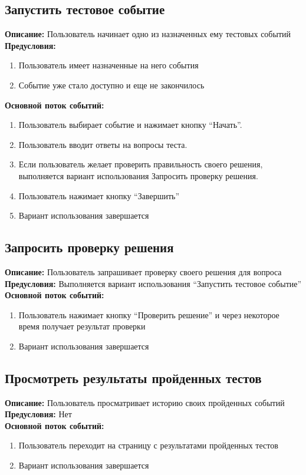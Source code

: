 \documentclass{article}
\begin{document}
    \subsection{Запустить тестовое событие}
    \textbf{Описание:} Пользователь начинает одно из назначенных ему тестовых
    событий\\
    \textbf{Предусловия:} 
    \begin{enumerate}
        \item Пользователь имеет назначенные на него события
        \item Событие уже стало доступно и еще не закончилось
    \end{enumerate}
    \textbf{Основной поток событий:}
    \begin{enumerate}
        \item Пользователь выбирает событие и нажимает кнопку “Начать”.
        \item Пользователь вводит ответы на вопросы теста.
        \item Если пользователь желает проверить правильность своего решения, выполняется вариант использования Запросить проверку решения.
        \item Пользователь нажимает кнопку “Завершить”
        \item Вариант использования завершается    
    \end{enumerate}

    \subsection{Запросить проверку решения}
    \textbf{Описание:} Пользователь запрашивает проверку своего решения для вопроса\\
    \textbf{Предусловия:} Выполняется вариант использования “Запустить тестовое событие”\\
    \textbf{Основной поток событий:}
    \begin{enumerate}
        \item Пользователь нажимает кнопку “Проверить решение” и через некоторое время получает результат проверки
        \item Вариант использования завершается
    \end{enumerate}

    \subsection{Просмотреть результаты пройденных тестов}
    \textbf{Описание:} Пользователь просматривает историю своих пройденных событий\\
    \textbf{Предусловия:} Нет\\
    \textbf{Основной поток событий:}
    \begin{enumerate}
        \item Пользователь переходит на страницу с результатами пройденных тестов
        \item Вариант использования завершается
    \end{enumerate}
\end{document}
